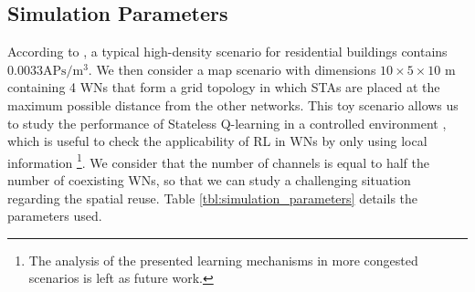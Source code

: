 \documentclass{article}
\begin{document}
	\subsection{Simulation Parameters}
	\label{section:simulation_parameters}
	According to \cite{bellalta2016ax}, a typical high-density scenario for residential buildings contains $0.0033 \text{APs}/\text{m}^3$. We then consider a map scenario with dimensions $10\times5\times10$ m containing 4 WNs that form a grid topology in which STAs are placed at the maximum possible distance from the other networks. This toy scenario allows us to study the performance of Stateless Q-learning in a controlled environment
	, which is useful to check the applicability of RL in WNs by only using local information \footnote{The analysis of the presented learning mechanisms in more congested scenarios is left as future work.}.
	We consider that the number of channels is equal to half the number of coexisting WNs, so that we can study a challenging situation regarding the spatial reuse. Table \ref{tbl:simulation_parameters} details the parameters used.	
\end{document}
